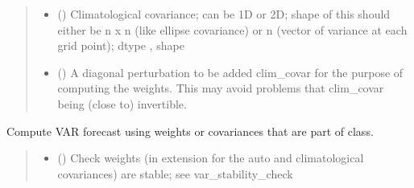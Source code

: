 \documentclass[letterpaper,10pt,english]{sphinxmanual}
\begin{document}
\begin{fulllineitems}
\begin{fulllineitems}
\begin{quote}
\begin{description}
\begin{itemize}
\item {}
\sphinxAtStartPar
{} () \textendash{} Climatological covariance;
can be 1D or 2D;
shape of this should either be n x n (like ellipse covariance)
or n (vector of variance at each grid point);
dtype , shape 

\item {}
\sphinxAtStartPar
{} () \textendash{} A diagonal perturbation to be added clim\_covar for
the purpose of computing the weights. This may avoid
problems that clim\_covar being (close to) invertible.

\end{itemize}

\end{description}\end{quote}

\end{fulllineitems}


\begin{fulllineitems}
\label{\detokenize{kalman:glomar_gridding.autoregressive_kalman.Autoregressive1ForecastVector.predict}}
\pysigstartsignatures
\pysiglinewithargsret
{}
{\sphinxparamcomma {}\sphinxparamcomma {}\sphinxparamcomma {}}
{}
\pysigstopsignatures
\sphinxAtStartPar
Compute VAR forecast using weights or covariances
that are part of class.
\begin{quote}\begin{description}
\begin{itemize}
\item {}
\sphinxAtStartPar
{} () \textendash{} Check weights (in extension for the auto and climatological
covariances) are stable; see var\_stability\_check


\end{itemize}
\end{description}
\end{quote}
\end{fulllineitems}
\end{fulllineitems}
\end{document}
